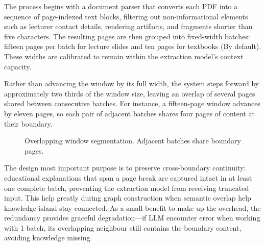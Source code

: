 The process begins with a document parser that converts each PDF into a sequence of page-indexed text blocks, filtering out non-informational 
elements such as lecturer contact details, rendering artifacts, and fragments shorter than five characters. The resulting pages are then grouped 
into fixed-width batches: fifteen pages per batch for lecture slides and ten pages for textbooks (By default). These widths are calibrated to remain within the 
extraction model's context capacity.

Rather than advancing the window by its full width, the system steps forward by approximately two thirds of the window size, leaving an overlap of several pages 
shared between consecutive batches. For instance, a fifteen-page window advances by eleven pages, so each pair of adjacent batches shares four pages of content at 
their boundary.

\begin{figure}[H]
\centering
{}
    \vspace{12pt}\caption{Overlapping window segmentation. Adjacent batches share boundary pages.}\label{fig:sliding_window}
\end{figure}

The design most important purpose is to preserve cross-boundary continuity: educational explanations that span a page break are captured intact in at 
least one complete batch, preventing the extraction model from receiving truncated input. This help greatly during graph construction when semantic overlap help knowledge 
island stay connected. As a small benefit to make up the overhead, the redundancy provides graceful degradation---if LLM encounter error when working with 1 batch, its overlapping 
neighbour still contains the boundary content, avoiding knowledge missing.

